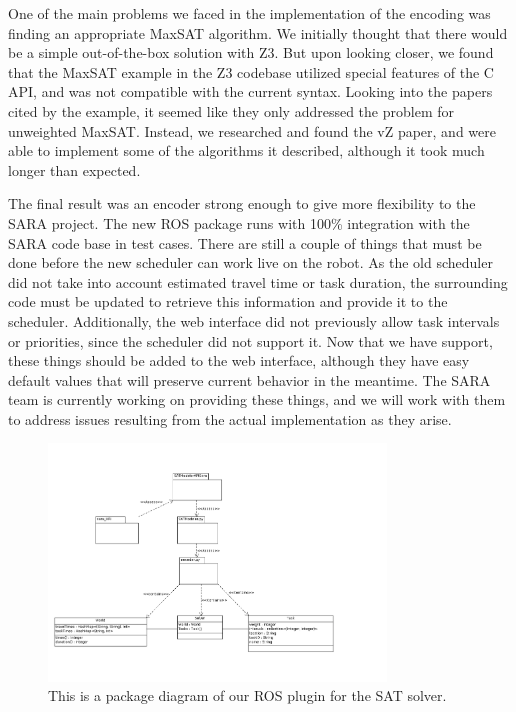 \documentclass[11pt]{article}
\begin{document}
One of the main problems we faced
in the implementation of the encoding
was finding an appropriate MaxSAT algorithm.
We initially thought that there would be a simple
out-of-the-box solution with Z3.
But upon looking closer,
we found that the MaxSAT example
in the Z3 codebase
utilized special features of the C API,
and was not compatible with the current syntax.
Looking into the papers cited by the example,
it seemed like they only addressed the problem
for unweighted MaxSAT.
Instead, we researched and found the vZ paper,
and were able to implement some of the algorithms
it described,
although it took much longer than expected.

The final result was an encoder strong enough to
give more flexibility to the SARA project. The new
ROS package runs with 100\% integration with the SARA
code base in test cases. There are still a couple of
things that must be done before the new scheduler
can work live on the robot.
As the old scheduler did not take into account
estimated travel time or task duration,
the surrounding code must be updated
to retrieve this information
and provide it to the scheduler.
Additionally, the web interface
did not previously allow task intervals or priorities,
since the scheduler did not support it.
Now that we have support,
these things should be added to the web interface,
although they have easy default values
that will preserve current behavior in the meantime.
The SARA team is currently working on providing these things,
and we will work with them to address issues resulting
from the actual implementation as they arise.

\begin{figure}
\centering
\includegraphics[width=0.8\textwidth]{ROS_Package_Diagram.png}
\caption{\label{fig:ROSPackageDiag}This is a package diagram of our ROS plugin for the SAT solver.}
\end{figure}
\end{document}
